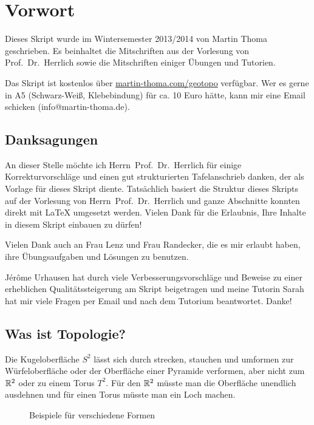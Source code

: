 \chapter*{Vorwort}
Dieses Skript wurde im Wintersemester 2013/2014
von Martin Thoma geschrieben. Es beinhaltet die Mitschriften aus
der Vorlesung von Prof.~Dr.~Herrlich sowie die Mitschriften einiger
Übungen und Tutorien.

Das Skript ist kostenlos über \href{http://martin-thoma.com/geotopo/}{martin-thoma.com/geotopo}
verfügbar. Wer es gerne in A5 (Schwarz-Weiß, Klebebindung) für ca. 10 Euro hätte, 
kann mir eine Email schicken (info@martin-thoma.de).

\section*{Danksagungen}
An dieser Stelle möchte ich Herrn~Prof.~Dr.~Herrlich für einige 
Korrekturvorschläge und einen gut strukturierten Tafelanschrieb 
danken, der als Vorlage für dieses Skript diente. Tatsächlich basiert
die Struktur dieses Skripts auf der Vorlesung von Herrn~Prof.~Dr.~Herrlich
und ganze Abschnitte konnten direkt mit \LaTeX{} umgesetzt werden.
Vielen Dank für die Erlaubnis, Ihre Inhalte in diesem Skript einbauen
zu dürfen!

Vielen Dank auch an Frau Lenz und Frau Randecker, die es mir erlaubt 
haben, ihre Übungsaufgaben und Lösungen zu benutzen.

Jérôme Urhausen hat durch viele Verbesserungsvorschläge und Beweise zu einer erheblichen
Qualitätssteigerung am Skript beigetragen und meine Tutorin Sarah hat mir
viele Fragen per Email und nach dem Tutorium beantwortet. Danke!


\section*{Was ist Topologie?}

Die Kugeloberfläche $S^2$ lässt sich durch strecken, stauchen
und umformen zur Würfeloberfläche oder
der Oberfläche einer Pyramide verformen, aber nicht zum $\mdr^2$
oder zu einem Torus $T^2$. Für den $\mdr^2$ müsste man die Oberfläche
unendlich ausdehnen und für einen Torus müsste man ein Loch machen.

\begin{figure}[ht]
    \centering
    \subfloat[$S^2$]{
        
        \label{fig:s2}
    }%
    \subfloat[Würfel]{
        
        \label{fig:cube}
    }%
    \subfloat[Pyramide]{
        
        \label{fig:pyramide}
    }

    \subfloat[$\mdr^2$]{
        
        \label{fig:plane-r2}
    }%
    \label{fig:formen}
    \caption{Beispiele für verschiedene Formen}
\end{figure}


